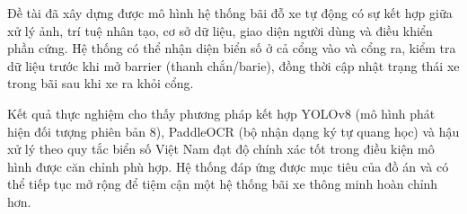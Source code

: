 \documentclass[a4paper,14pt]{extreport}
\begin{document}
Đề tài đã xây dựng được mô hình hệ thống bãi đỗ xe tự động có sự kết hợp giữa xử lý ảnh, trí tuệ nhân tạo, cơ sở dữ liệu, giao diện người dùng và điều khiển phần cứng. Hệ thống có thể nhận diện biển số ở cả cổng vào và cổng ra, kiểm tra dữ liệu trước khi mở barrier (thanh chắn/barie), đồng thời cập nhật trạng thái xe trong bãi sau khi xe ra khỏi cổng.

Kết quả thực nghiệm cho thấy phương pháp kết hợp YOLOv8 (mô hình phát hiện đối tượng phiên bản 8), PaddleOCR (bộ nhận dạng ký tự quang học) và hậu xử lý theo quy tắc biển số Việt Nam đạt độ chính xác tốt trong điều kiện mô hình được căn chỉnh phù hợp. Hệ thống đáp ứng được mục tiêu của đồ án và có thể tiếp tục mở rộng để tiệm cận một hệ thống bãi xe thông minh hoàn chỉnh hơn.
\end{document}
